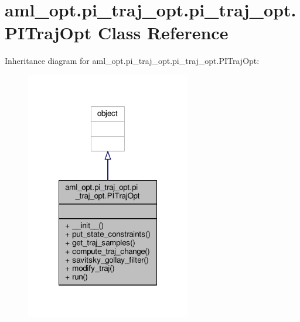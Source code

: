 \hypertarget{classaml__opt_1_1pi__traj__opt_1_1pi__traj__opt_1_1_p_i_traj_opt}{\section{aml\-\_\-opt.\-pi\-\_\-traj\-\_\-opt.\-pi\-\_\-traj\-\_\-opt.\-P\-I\-Traj\-Opt Class Reference}
\label{classaml__opt_1_1pi__traj__opt_1_1pi__traj__opt_1_1_p_i_traj_opt}
}


Inheritance diagram for aml\-\_\-opt.\-pi\-\_\-traj\-\_\-opt.\-pi\-\_\-traj\-\_\-opt.\-P\-I\-Traj\-Opt\-:
\nopagebreak
\begin{figure}[H]
\begin{center}
\leavevmode
\includegraphics[width=204pt]{classaml__opt_1_1pi__traj__opt_1_1pi__traj__opt_1_1_p_i_traj_opt__inherit__graph}
\end{center}
\end{figure}


